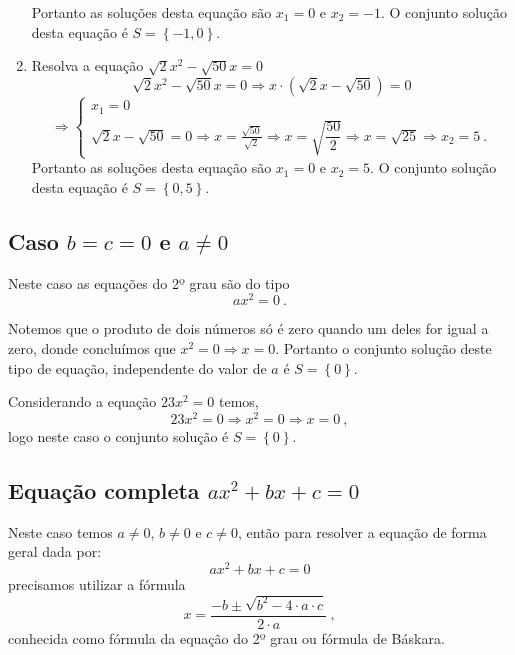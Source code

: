 \begin{exem}
\begin{enumerate}[1)]
 Portanto as soluções desta equação são $x_1= 0$ e $x_2= -1$. O conjunto solução desta equação é $S= \left\{ -1, 0 \right\}$.

 \item Resolva a equação $\sqrt{2}x^2 - \sqrt{50}x=0$
 \[\sqrt{2}x^2 - \sqrt{50}x=0 \Rightarrow x \cdot (\sqrt{2}x - \sqrt{50})= 0 \]
 \[\Rightarrow
 \begin{cases}
 x_1=0 \\
 \sqrt{2}x - \sqrt{50}=0 \Rightarrow x= \frac{\sqrt{50}}{\sqrt{2}} \Rightarrow x= \sqrt{\dfrac{50}{2}} \Rightarrow x= \sqrt{25} \Rightarrow x_2= 5 \ .
 \end{cases}
 \]
 Portanto as soluções desta equação são $x_1= 0$ e $x_2= 5$. O conjunto solução desta equação é $S= \left\{ 0, 5 \right\}$.
 \end{enumerate}
 \end{exem}

 \subsection{Caso \texorpdfstring{$b=c=0$ e $a \neq 0$}{b=c=0 e a não nulo}}

 Neste caso as equações do 2º grau são do tipo
 \[ax^2 = 0 \ . \]

  Notemos que o produto de dois números só é zero quando um deles for igual a zero, donde concluímos que $x^2 = 0 \Rightarrow x =0$. Portanto o conjunto solução deste tipo de equação, independente do valor de $a$ é $S= \left\{ 0 \right\}$.

  \begin{exem} Considerando a equação $23x^2=0$ temos,
  \[23x^2= 0 \Rightarrow x^2=0 \Rightarrow x= 0 \ , \]
  logo neste caso o conjunto solução é $S= \left\{ 0 \right\}$.
  \end{exem}

 \subsection{Equação completa \texorpdfstring{$ax^2+ bx + c = 0$}{ax² + bx + c = 0}}

 Neste caso temos $a \neq 0$, $b \neq 0$ e $c \neq 0$, então para resolver a equação de forma geral dada por:
 \[ax^2+ bx + c = 0 \]
 precisamos utilizar a fórmula
 \[x = \dfrac{-b \pm \sqrt{b^2 - 4 \cdot a \cdot c}}{2 \cdot a} \ ,\]
 conhecida como fórmula da equação do 2º grau ou fórmula de Báskara.


